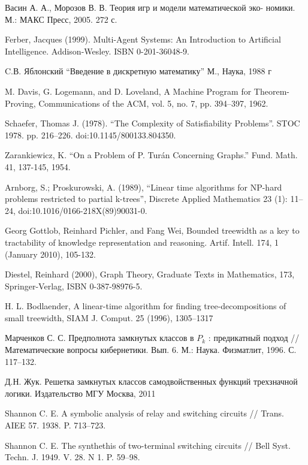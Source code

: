 \documentclass[12pt]{extarticle}
\begin{document}

Васин А. А., Морозов В. В. Теория игр и модели математической эко-
номики. М.: МАКС Пресс, 2005. 272 с.

Ferber, Jacques (1999). Multi-Agent Systems: An Introduction to Artificial Intelligence. Addison-Wesley.
ISBN 0-201-36048-9.

C.В. Яблонский ``Введение в дискретную математику'' М., Наука, 1988 г

M. Davis, G. Logemann, and D. Loveland, A Machine Program for Theorem-Proving,
Communications of the ACM, vol. 5, no. 7, pp. 394–397, 1962.

 Schaefer, Thomas J. (1978). 
``The Complexity of Satisfiability Problems''. STOC 1978. pp. 216–226. doi:10.1145/800133.804350.

 Zarankiewicz, K. ``On a Problem of P. Turán Concerning Graphs.'' Fund. Math. 41, 137-145, 1954. 

 Arnborg, S.; Proskurowski, A. (1989), 
``Linear time algorithms for NP-hard problems restricted to partial k-trees'',
Discrete Applied Mathematics 23 (1): 11–24, doi:10.1016/0166-218X(89)90031-0.

Georg Gottlob, Reinhard Pichler, and Fang Wei, 
Bounded treewidth as a key to tractability of knowledge representation and reasoning. 
Artif. Intell. 174, 1 (January 2010), 105-132. 

Diestel, Reinhard (2000), Graph Theory, Graduate Texts in Mathematics, 
173, Springer-Verlag, ISBN 0-387-98976-5.

H. L. Bodlaender, A linear-time algorithm for finding 
tree-decompositions of small
treewidth, SIAM J. Comput. 25 (1996), 1305–1317

Марченков С. С. Предполнота замкнутых классов в $P_k$ : предикатный
подход // Математические вопросы кибернетики. Вып. 6. М.: Наука.
Физматлит, 1996. С. 117–132.

Д.Н. Жук. Решетка замкнутых классов самодвойственных функций трехзначной логики. Издательство МГУ Москва, 2011

Shannon C. E. A symbolic analysis of relay and switching circuits // Trans.
AIEE 57. 1938. P. 713–723.

Shannon C. E. The synthethis of two-terminal switching circuits // Bell
Syst. Techn. J. 1949. V. 28. N 1. P. 59–98.

\endthebibliography
\end{document}
